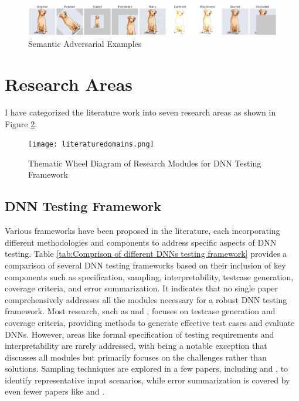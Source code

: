   \begin{figure}
    \centering
    \includegraphics[width=\linewidth]{figures/output_update.png}
    \caption{Semantic Adversarial Examples}
    \label{fig:image-trans}
  \end{figure}


\section{Research Areas}
I have categorized the literature work into seven research areas as shown in Figure \ref{fig:thematic_wheel}. 
\begin{figure}[h]
  \centering
  \texttt{[image: literaturedomains.png]}
  \caption{Thematic Wheel Diagram of Research Modules for DNN Testing Framework}
  \label{fig:thematic_wheel}
\end{figure}

\subsection{DNN Testing Framework}
 Various frameworks have been proposed in the literature, each incorporating different methodologies and components to address specific aspects of DNN testing. Table \ref{tab:Comprison of different DNNs testing framework} provides a comparison of several DNN testing frameworks based on their inclusion of key components such as specification, sampling, interpretability, testcase generation, coverage criteria, and error summarization. It indicates that no single paper comprehensively addresses all the modules necessary for a robust DNN testing framework. Most research, such as \cite{deepxplore} and \cite{deeptest}, focuses on testcase generation and coverage criteria, providing methods to generate effective test cases and evaluate DNNs. However, areas like formal specification of testing requirements and interpretability are rarely addressed, with \cite{Braiek} being a notable exception that discusses all modules but primarily focuses on the challenges rather than solutions. Sampling techniques are explored in a few papers, including \cite{Sekhon} and \cite{Dola}, to identify representative input scenarios, while error summarization is covered by even fewer papers like \cite{ChenJ} and \cite{Deepmutation}.

